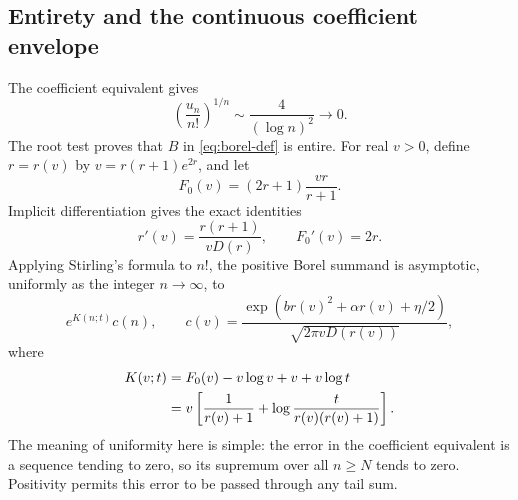 \documentclass[11pt,a4paper]{article}
\theoremstyle{definition}
\numberwithin{equation}{section}
\begin{document}
\subsection{Entirety and the continuous coefficient envelope}
The coefficient equivalent gives
\[
 \left(\frac{u_n}{n!}\right)^{1/n}
                         \sim\frac4{(\log n)^2}\longrightarrow0.
\]
The root test proves that \(B\) in \eqref{eq:borel-def} is entire.
For real \(v>0\), define \(r=r(v)\) by
\(v=r(r+1)e^{2r}\), and let
\begin{equation}
 F_0(v)=(2r+1)\frac{vr}{r+1}.
 \label{eq:F0}
\end{equation}
Implicit differentiation gives the exact identities
\begin{equation}
 r'(v)=\frac{r(r+1)}{vD(r)},\qquad F_0'(v)=2r.
 \label{eq:r-derivative}
\end{equation}
Applying Stirling's formula to \(n!\), the positive Borel summand is
asymptotic, uniformly as the integer \(n\to\infty\), to
\begin{equation}
 e^{K(n;t)}c(n),\qquad
 c(v)=\frac{\exp(br(v)^2+\alpha r(v)+\eta/2)}
                 {\sqrt{2\pi vD(r(v))}},
 \label{eq:borel-summand}
\end{equation}
where
\begin{align}
 K(v;t)&=F_0(v)-v\log v+v+v\log t\notag\\
       &=v\left[\frac1{r(v)+1}
                      +\log\frac{t}{r(v)(r(v)+1)}\right].
 \label{eq:K}
\end{align}
The meaning of uniformity here is simple: the error in the coefficient
equivalent is a sequence tending to zero, so its supremum over all
\(n\ge N\) tends to zero. Positivity permits this error to be passed
through any tail sum.
\end{document}

